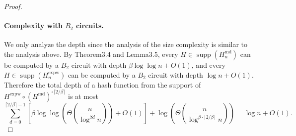 \begin{proof}
\paragraph{Complexity with $B_2$ circuits.}
We only analyze the depth since the analysis of the size complexity is similar to the analysis above. By Theorem3.4 and Lemma3.5, every $H\in\operatorname{supp}(H_n^{\mathrm{md}})$ can be computed by a $B_2$ circuit with depth $\beta\log\log n+O(1)$, and every $H\in\operatorname{supp}(H_n^{\mathrm{expw}})$ can be computed by a $B_2$ circuit with depth $\log n+O(1)$. Therefore the total depth of a hash function from the support of $H^{\mathrm{expw}}\circ(H^{\mathrm{md}})^{\circ\lceil2/\beta\rceil}$ is at most
\[\sum_{d=0}^{\lceil2/\beta\rceil-1}\left[\beta\log\log\left(\Theta\left(\frac n{\log^{\beta d}n}\right)\right)+O(1)\right]+\log\left(\Theta\left(\frac n{\log^{\beta\cdot\lceil2/\beta\rceil}n}\right)\right)=\log n+O(1).\]
\end{proof}
